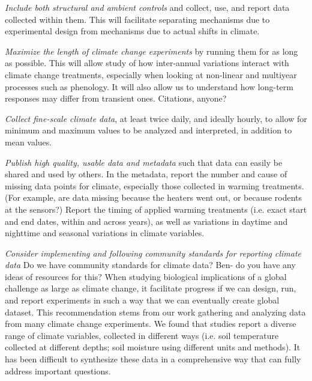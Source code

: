 \documentclass{article}
\begin{document}
\par\textit{Include both structural and ambient controls} and collect, use, and report data collected within them. This will facilitate separating mechanisms due to experimental design from mechanisms due to actual shifts in climate.  
\par\textit{Maximize the length of climate change experiments} by running them for as long as possible. This will allow study of how inter-annual variations interact with climate change treatments, especially when looking at non-linear and multiyear processes such as phenology. It will also allow us to understand how long-term responses may differ from  transient ones. Citations, anyone?
\par\textit{Collect fine-scale climate data}, at least twice daily, and ideally hourly, to allow for minimum and maximum values to be analyzed and interpreted, in addition to mean values.
 \par\textit{Publish high quality, usable data and metadata} such that data can easily be shared and used by others. In the metadata, report the number and cause of missing data points for climate, especially those collected in warming treatments. (For example, are data missing because the heaters went out, or because rodents at the sensors?) Report the timing of applied warming treatments (i.e. exact start and end dates, within and across years), as well as variations in daytime and nighttime and seasonal variations in climate variables. 
\par\textit{Consider implementing and following community standards for reporting climate data} Do we have community standards for climate data? Ben- do you have any ideas of resources for this?
When studying biological implications of a global challenge as large as climate change, it facilitate progress if we can design, run, and report experiments in such a way that we can eventually create global dataset. This recommendation stems from our work gathering and analyzing data from many climate change experiments. We found that studies report a diverse range of climate variables, collected in different ways (i.e. soil temperature collected at different depths; soil moisture using different units and methods). It has been difficult to synthesize these data in a comprehensive way that can fully address important questions. 
\end{document}
